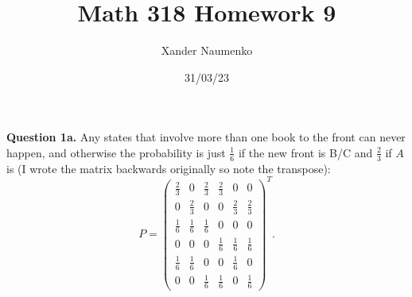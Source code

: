 \documentclass[letterpaper, reqno,11pt]{article}
\begin{document}
\title{Math 318 Homework 9}
\date{31/03/23}
\author{Xander Naumenko}
\maketitle

{\medskip\noindent\bf Question 1a.} Any states that involve more than one book to the front can never happen, and otherwise the probability is just $\frac{1}{6}$ if the new front is B/C and $\frac{2}{3}$ if $A$ is (I wrote the matrix backwards originally so note the transpose):
\[
    P=\begin{pmatrix}
        \frac{2}{3}&0&\frac{2}{3}&\frac{2}{3}&0&0\\
        0&\frac{2}{3}&0&0&\frac{2}{3}&\frac{2}{3}\\
        \frac{1}{6}&\frac{1}{6}&\frac{1}{6}&0&0&0\\
        0&0&0&\frac{1}{6}&\frac{1}{6}&\frac{1}{6}\\
        \frac{1}{6}&\frac{1}{6}&0&0&\frac{1}{6}&0\\
        0&0&\frac{1}{6}&\frac{1}{6}&0&\frac{1}{6}
    \end{pmatrix}^T
.\]
\end{document}
